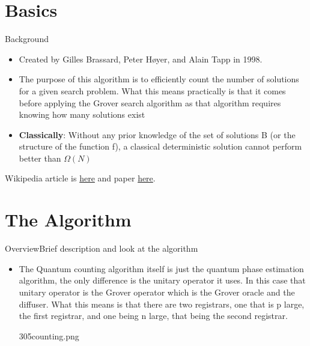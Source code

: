 \def\OtherAuthors{ and Mitch Oldham}

\section*{Basics}




\begin{frame}{Background}{}
\begin{itemize}
    \item Created by Gilles Brassard, Peter Høyer, and Alain Tapp in 1998.
    \item The purpose of this algorithm is to efficiently count the number of solutions for a given search problem. What this means practically  is that it comes before applying the Grover search algorithm as that algorithm requires knowing how many solutions exist
    \item \textbf{Classically}: Without any prior knowledge of the set of solutions B (or the structure of the function f), a classical deterministic solution cannot perform better than $\Omega(N)$

\end{itemize}
Wikipedia article is \href{https://en.wikipedia.org/wiki/Quantum_counting_algorithm}{here} and paper \href{https://link.springer.com/chapter/10.1007/BFb0055105}{here}.
\end{frame}



\section*{The Algorithm}


\begin{frame}{Overview}{Brief description and look at the algorithm}
\begin{itemize}
    \item The Quantum counting algorithm itself is just the quantum phase estimation algorithm, the only difference is the unitary operator it uses. In this case that unitary operator is the Grover operator which is the Grover oracle and the diffuser. What this means is that there are two registrars, one that is p large, the first registrar, and one being n large, that being the second registrar. 

    \vspace{1mm}


    \begin{center}\begin{Pixture}[width=0.7\textwidth]{305}{counting.png}
\end{Pixture}\end{center}


\end{itemize}
\end{frame}


